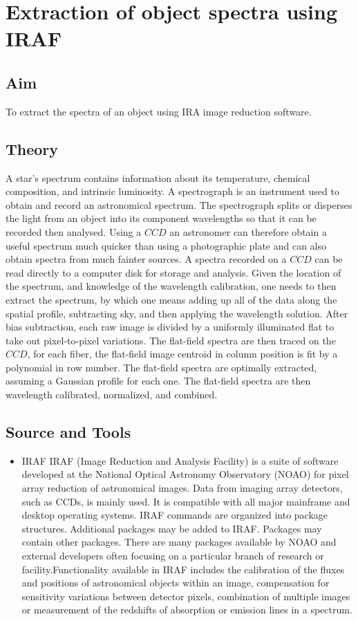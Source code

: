 \documentclass[letterpaper,11pt]{report}
\begin{document}
\chapter{Extraction of object spectra using IRAF}
\section{Aim}
To extract the spectra of an object using IRA image reduction software.
\section{Theory}
A star’s spectrum contains information about its temperature, chemical composition, and intrinsic luminosity.
A spectrograph is an instrument used to obtain and record an astronomical spectrum. The spectrograph splits
or disperses the light from an object into its component wavelengths so that it can be recorded then analysed.
Using a $CCD$ an astronomer can therefore obtain a useful spectrum much quicker than using a photographic
plate and can also obtain spectra from much fainter sources. A spectra recorded on a $CCD$ can be read directly
to a computer disk for storage and analysis.
Given the location of the spectrum, and knowledge of the wavelength calibration, one needs to then extract the
spectrum, by which one means adding up all of the data along the spatial profile, subtracting sky, and then
applying the wavelength solution. After bias subtraction, each raw image is divided by a uniformly illuminated
flat to take out pixel-to-pixel variations. The flat-field spectra are then traced on the $CCD$, for each fiber,
the flat-field image centroid in column position is fit by a polynomial in row number. The flat-field spectra
are optimally extracted, assuming a Gaussian profile for each one. The flat-field spectra are then wavelength calibrated, normalized, and combined.

\section{Source and Tools}
\begin{itemize}
    \item IRAF
    \newline
    IRAF (Image Reduction and Analysis Facility) is a suite of software developed at the National Optical Astronomy Observatory (NOAO) for pixel array reduction of astronomical images. Data from imaging array detectors, such as CCDs, is mainly used. It is compatible with all major mainframe and desktop operating systems.
    IRAF commands are organized into package structures. Additional packages may be added to IRAF. Packages may contain other packages. There are many packages available by NOAO and external developers often focusing on a particular branch of research or facility.Functionality available in IRAF includes the calibration of the fluxes and positions of astronomical objects within an image, compensation for sensitivity variations between detector pixels, combination of multiple images or measurement of the redshifts of absorption or emission lines in a spectrum.
\end{itemize}
\end{document}
